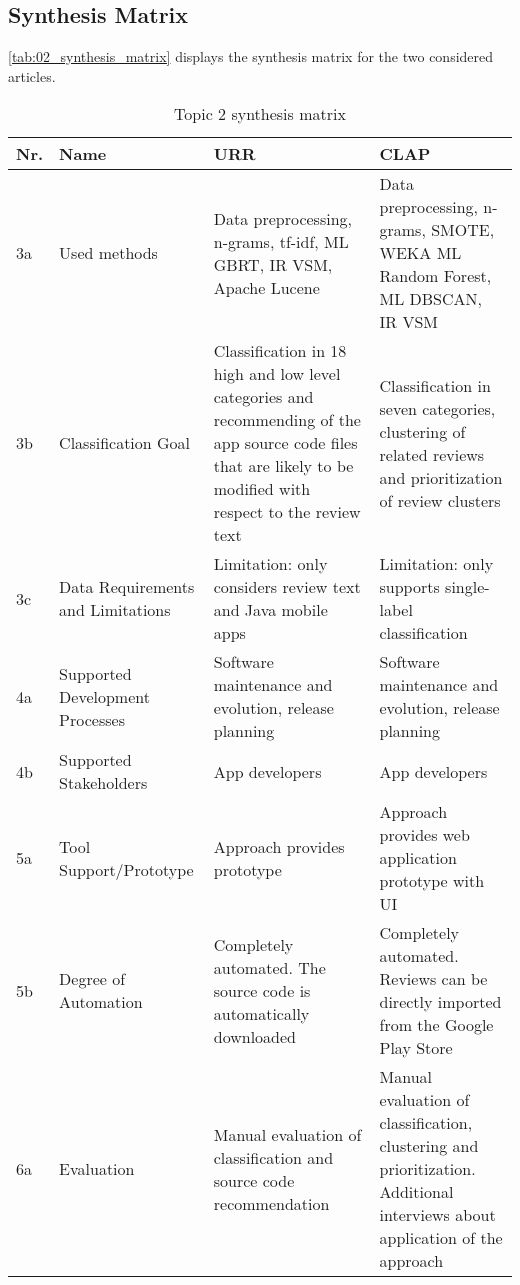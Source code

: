 \subsection{Synthesis Matrix}
\autoref{tab:02_synthesis_matrix} displays the synthesis matrix for the two considered articles.

\begin{table}
    \centering
    \caption{Topic 2 synthesis matrix}
    \begin{tabular}{l|p{2.5cm}|p{5cm}|p{5cm}} \hline
        Nr.     & Name                  & URR \cite{Ciurumelea.2017} & CLAP \cite{Scalabrino.2019} \\  \hline\hline
        3a      & Used methods          & Data preprocessing, n-grams, tf-idf, ML GBRT, IR VSM, Apache Lucene & Data preprocessing, n-grams, SMOTE, WEKA ML Random Forest, ML DBSCAN, IR VSM\\ \hline
    3b      & Classification Goal       & Classification in 18 high and low level categories and recommending of the app source code files that are likely to be modified with respect to the review text & Classification in seven categories, clustering of related reviews and prioritization of review clusters \\ \hline
        3c      & Data Requirements and Limitations  & Limitation: only considers review text and Java mobile apps & Limitation: only supports single-label classification\\ \hline
        4a      & Supported Development Processes                    & 
        Software maintenance and evolution, release planning & Software maintenance and evolution, release planning\\ \hline
        4b      & Supported Stakeholders                               & App developers & App developers\\ \hline
        5a      & Tool Support/Prototype                               & Approach provides prototype & Approach provides web application prototype with UI \\ \hline
        5b      & Degree of Automation                            & Completely automated. The source code is automatically downloaded& 
        Completely automated. Reviews can be directly imported from the Google Play Store\\ \hline
        6a      & Evaluation                              & Manual evaluation of classification and source code recommendation & Manual evaluation of classification, clustering and prioritization. Additional interviews about application of the approach\\ \hline

\end{tabular}
\end{table}
